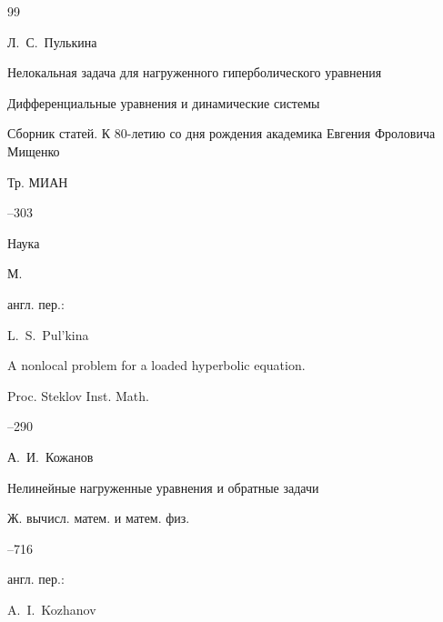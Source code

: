 \begin{thebibliography}{99}





\by Л.~С.~Пулькина

\paper Нелокальная задача для нагруженного гиперболического уравнения

\inbook Дифференциальные уравнения и динамические системы

\bookinfo Сборник статей. К 80-летию со дня рождения академика Евгения Фроловича Мищенко

\serial Тр. МИАН



--303

\publ Наука

\publaddr М.




\transl англ. пер.:~

\by L.~S.~Pul'kina

\paper  A nonlocal problem for a loaded hyperbolic equation.

\jour Proc. Steklov Inst. Math.



--290




\by А.~И.~Кожанов

\paper Нелинейные нагруженные уравнения и обратные задачи

\jour Ж. вычисл. матем. и матем. физ.




--716




\transl англ. пер.:~

\by A.~I.~Kozhanov 


\end{thebibliography}

